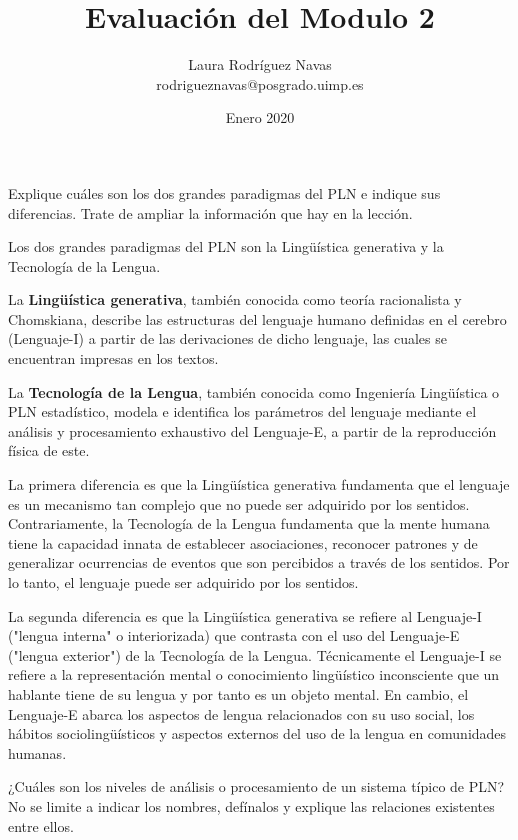 \documentclass{exam}
\title{Evaluación del Modulo 2}
\author{Laura Rodríguez Navas \\ rodrigueznavas@posgrado.uimp.es}
\date{Enero 2020}
\begin{document}
\maketitle

\setcounter{page}{1}

\begin{questions}
	
\question Explique cuáles son los dos grandes paradigmas del PLN e indique sus diferencias. Trate de ampliar la información que hay en la lección.

Los dos grandes paradigmas del PLN son la Lingüística generativa y la Tecnología de la Lengua.

La {\bf Lingüística generativa}, también conocida como teoría racionalista y Chomskiana, describe las estructuras del lenguaje humano definidas en el cerebro (Lenguaje-I) a partir de las derivaciones de dicho lenguaje, las cuales se encuentran
impresas en los textos.
	
La {\bf Tecnología de la Lengua}, también conocida como Ingeniería Lingüística o PLN estadístico, modela e identifica los parámetros del lenguaje mediante el análisis y procesamiento exhaustivo del Lenguaje-E, a partir de la reproducción física de este.

La primera diferencia es que la Lingüística generativa fundamenta que el lenguaje es un mecanismo tan complejo que no puede ser adquirido por los sentidos. Contrariamente, la Tecnología de la Lengua fundamenta que la mente humana tiene la capacidad innata de establecer asociaciones, reconocer patrones y de generalizar ocurrencias de eventos que son percibidos a través de los sentidos. Por lo tanto, el lenguaje puede ser adquirido por los sentidos.

La segunda diferencia es que la Lingüística generativa se refiere al Lenguaje-I ("lengua interna" o interiorizada) que contrasta con el uso del Lenguaje-E ("lengua exterior") de la Tecnología de la Lengua. Técnicamente el Lenguaje-I se refiere a la representación mental o conocimiento lingüístico inconsciente que un hablante tiene de su lengua y por tanto es un objeto mental. En cambio, el Lenguaje-E abarca los aspectos de lengua relacionados con su uso social, los hábitos sociolingüísticos y aspectos externos del uso de la lengua en comunidades humanas. 

\question ¿Cuáles son los niveles de análisis o procesamiento de un sistema típico de PLN? No se limite a indicar los nombres, defínalos y explique las relaciones existentes entre ellos.


\end{questions}
\end{document}
